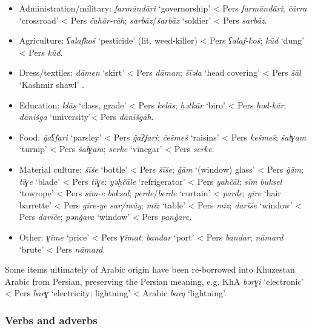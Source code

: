\documentclass[output=paper,nonflat]{langsci/langscibook}
\begin{document}
\begin{itemize} 
\item Administration/military: \textit{farmāndāri} ‘governorship’ < Pers \textit{farmāndāri}; \textit{čārra} ‘crossroad’ < Pers \textit{čahār-rāh}; \textit{sarbāz}/\textit{šarbāz} ‘soldier’ < Pers \textit{sarbāz}.
\item Agriculture: \textit{ʕalafkoš} ‘pesticide' (lit. weed-killer) < Pers \textit{ʕalaf-koš}; \textit{kūd} ‘dung’ < Pers \textit{kūd}. 
\item Dress/textiles: \textit{dāmen} ‘skirt’ < Pers \textit{dāman}; \textit{šīəla} ‘head covering’ < Pers \textit{šāl} ‘Kashmir shawl’ \citep[174]{Ingham2005}.
\item Education:  \textit{klāṣ} ‘class, grade’ < Pers \textit{kelās}; \textit{ḫətkār} ‘biro’ < Pers \textit{ḫod-kār}; \textit{dānišga} ‘university’\textit{<} Pers \textit{dānišgāh}.
\item Food: \textit{ǧaʕfari} ‘parsley’ < Pers \textit{ǧaʔfari}; \textit{češmeš} ‘raisins’ < Pers \textit{kešmeš}; \textit{šalɣam} ‘turnip’ < Pers \textit{šalɣam}; \textit{serke} ‘vinegar’ < Pers \textit{serke}.
\item Material culture: \textit{šīše} ‘bottle’ < Pers \textit{šīše}; \textit{ǧām} ‘(window) glass’ < Pers \textit{ǧām}; \textit{tīɣe} ‘blade’ < Pers \textit{tīɣe}; \textit{yəḫčāle} ‘refrigerator’ < Pers \textit{yahčāl}; \textit{sīm} \textit{buksel} ‘towrope’ < Pers \textit{sīm-e} \textit{boksol}; \textit{perde}/\textit{berde} ‘curtain’ < \textit{parde}; \textit{gīre} ‘hair barrette’ < Pers \textit{gīre-ye} \textit{sar/mūy}; \textit{mīz} ‘table’ < Pers \textit{mīz}; \textit{darīše} ‘window’ < Pers \textit{darīče}; \textit{pənǧara} ‘window’ < Pers \textit{panǧare}.
\item Other: \textit{ɣīme} ‘price’ < Pers \textit{ɣīmat}; \textit{bandar} ‘port’ < Pers \textit{bandar}; \textit{nāmard} ‘brute’ < Pers \textit{nāmard}.
\end{itemize}

Some items ultimately of Arabic origin have been re-borrowed into Khuzestan Arabic from Persian, preserving the Persian meaning, e.g. KhA \textit{bərɣi} ‘electronic’ < Pers \textit{barɣ} ‘electricity; lightning’ < Arabic \textit{barq} ‘lightning’. 


\subsubsection{Verbs and adverbs} 
\end{document}
